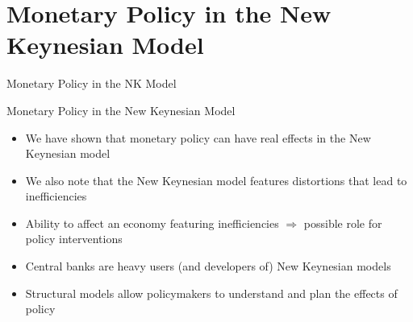 \section{Monetary Policy in the New Keynesian Model}

\begin{frame}

\begin{center}
{\LARGE Monetary Policy in the NK Model}
\end{center}

\end{frame}



\begin{frame}{Monetary Policy in the New Keynesian Model}

\begin{itemize}
\item	We have shown that monetary policy can have real effects in the New Keynesian model
\item	We also note that the New Keynesian model features distortions that lead to inefficiencies
\item	Ability to affect an economy featuring inefficiencies $\Rightarrow$ possible role for policy interventions
\item	Central banks are heavy users (and developers of) New Keynesian models
\item	Structural models allow policymakers to understand and plan the effects of policy
\end{itemize}

\end{frame}


	
